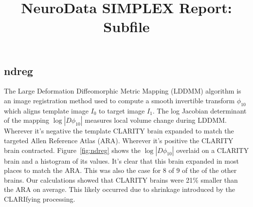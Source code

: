 \documentclass[simplex.tex]{subfiles}
\title{NeuroData SIMPLEX Report: Subfile}
\begin{document}


\subsection{ndreg}

The Large Deformation Diffeomorphic Metric Mapping (LDDMM) algorithm is
an image registration method used to compute a smooth invertible
transform $\phi_{10}$ which aligns template image $I_0$ to target
image $I_1$. The log Jacobian determinant of the mapping $\log
|D\phi_{10}|$ measures local volume change during LDDMM.  Wherever it’s
negative the template CLARITY brain expanded to match the targeted Allen
Reference Atlas (ARA).  Wherever it’s positive the CLARITY brain
contracted.  Figure~\ref{fig:ndreg} shows the $\log |D\phi_{10}|$ overlaid
on a CLARITY brain and a histogram of its values.  It’s clear that this
brain expanded in most places to match the ARA.  This was also the case
for 8 of 9 of the of the other brains.  Our calculations showed that
CLARITY brains were 21\% smaller than the ARA on average.  This likely
occurred due to shrinkage introduced by the CLARIfying processing.
\end{document}
